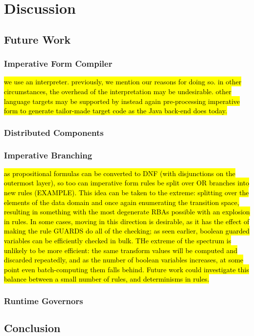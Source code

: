 \chapter{Discussion}
\section{Future Work}
\subsection{Imperative Form Compiler}
\hl{we use an interpreter. previously, we mention our reasons for doing so. in other circumstances, the overhead of the interpretation may be undesirable. other language targets may be supported by instead again pre-processing imperative form to generate tailor-made target code as the Java back-end does today.}
\subsection{Distributed Components}
\subsection{Imperative Branching}
\hl{as propositional formulas can be converted to DNF (with disjunctions on the outermost layer), so too can imperative form rules be split over OR branches into new rules (EXAMPLE). This idea can be taken to the extreme: splitting over the elements of the data domain and once again enumerating the transition space, resulting in something with the most degenerate RBAs possible with an explosion in rules. In some cases, moving in this direction is desirable, as it has the effect of making the rule GUARDS do all of the checking; as seen earlier, boolean guarded variables can be efficiently checked in bulk. THe extreme of the spectrum is unlikely to be more efficient: the same transform values will be computed and discarded repeatedly, and as the number of boolean variables increases, at some point even batch-computing them falls behind. Future work could investigate this balance between a small number of rules, and determinisms in rules.}
\subsection{Runtime Governors}
\section{Conclusion}
